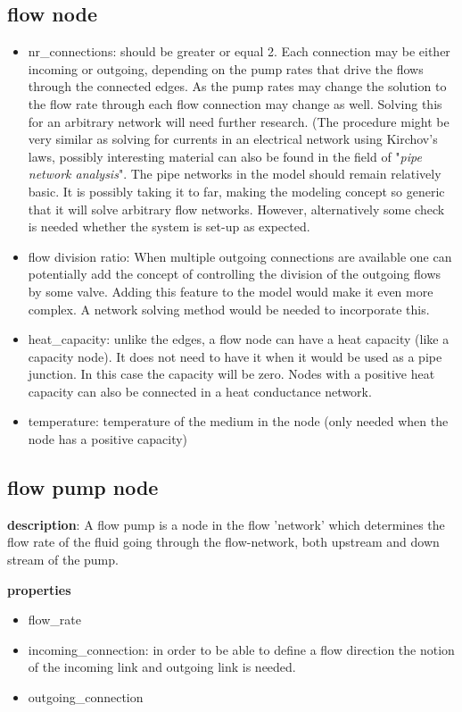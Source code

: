 \subsection{flow node}
\begin{itemize}
	\item nr\_connections: should be greater or equal 2. Each connection may be either incoming or outgoing, depending on the pump rates that drive the flows through the connected edges. As the pump rates may change the solution to the flow rate through each flow connection may change as well. Solving this for an arbitrary network will need further research. (The procedure might be very similar as solving for currents in an electrical network using Kirchov's laws, possibly interesting material can also be found in the field of "\textit{pipe network analysis}". The pipe networks in the model should remain relatively basic. It is possibly taking it to far, making the modeling concept so generic that it will solve arbitrary flow networks. However, alternatively some check is needed whether the system is set-up as expected. 
	\item flow division ratio: When multiple outgoing connections are available one can potentially add the concept of controlling the division of the outgoing flows by some valve. Adding this feature to the model would make it even more complex. A network solving method would be needed to incorporate this. 
	\item heat\_capacity: unlike the edges, a flow node can have a heat capacity (like a capacity node). It does not need to have it when it would be used as a pipe junction. In this case the capacity will be zero. Nodes with a positive heat capacity can also be connected in a heat conductance network. 
	\item temperature: temperature of the medium in the node (only needed when the node has a positive capacity)
\end{itemize}

\subsection{flow pump node}
\textbf{description}: A flow pump is a node in the flow 'network' which determines the flow rate of the fluid going through the flow-network, both upstream and down stream of the pump. 

\textbf{properties}
\begin{itemize}
	\item flow\_rate
	\item incoming\_connection: in order to be able to define a flow direction the notion of the incoming link and outgoing link is needed. 
	\item outgoing\_connection
\end{itemize}  


